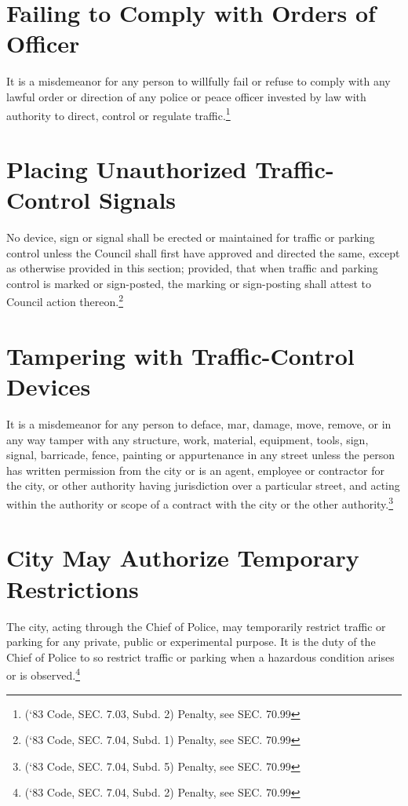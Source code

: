 \section{Failing to Comply with Orders of Officer}
It is a misdemeanor for any person to willfully fail or refuse to comply with any lawful order or direction of any police or peace officer invested by law with authority to direct, control or regulate traffic.\footnote{(‘83 Code, SEC. 7.03, Subd. 2)  Penalty, see SEC. 70.99}

\section{Placing Unauthorized Traffic-Control Signals}
No device, sign or signal shall be erected or maintained for traffic or parking control unless the Council shall first have approved and directed the same, except as otherwise provided in this section; provided, that when traffic and parking control is marked or sign-posted, the marking or sign-posting shall attest to Council action thereon.\footnote{(‘83 Code, SEC. 7.04, Subd. 1)  Penalty, see SEC. 70.99}

\section{Tampering with Traffic-Control Devices}
It is a misdemeanor for any person to deface, mar, damage, move, remove, or in any way tamper with any structure, work, material, equipment, tools, sign, signal, barricade, fence, painting or appurtenance in any street unless the person has written permission from the city or is an agent, employee or contractor for the city, or other authority having jurisdiction over a particular street, and acting within the authority or scope of a contract with the city or the other authority.\footnote{(‘83 Code, SEC. 7.04, Subd. 5)  Penalty, see SEC. 70.99}

\section{City May Authorize Temporary Restrictions}
The city, acting through the Chief of Police, may temporarily restrict traffic or parking for any private, public or experimental purpose.  It is the duty of the Chief of Police to so restrict traffic or parking when a hazardous condition arises or is observed.\footnote{(‘83 Code, SEC. 7.04, Subd. 2)  Penalty, see SEC. 70.99}

